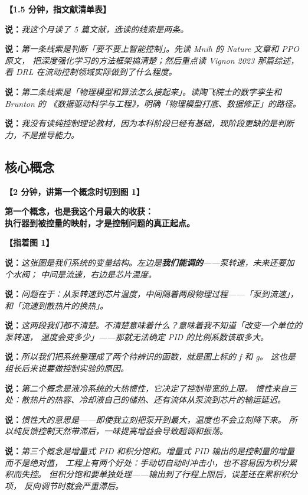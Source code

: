 \documentclass[11pt,a4paper]{ctexart}
\newcommand{\shuo}[1]{\par{\color{cBlue}\bfseries 说：}{\itshape #1}\par}
\newcommand{\dongzuo}[1]{\par{\color{cWarnLine}\bfseries 【#1】}\par}
\begin{document}
\dongzuo{1.5 分钟，指文献清单表}

\shuo{我这个月读了 5 篇文献，选读的线索是两条。}

\shuo{第一条线索是判断「要不要上智能控制」。先读 Mnih 的 Nature 文章和 PPO 原文，
把深度强化学习的方法框架搞清楚；然后重点读 Vignon 2023 那篇综述，
看 DRL 在流动控制领域实际做到了什么程度。}

\shuo{第二条线索是「物理模型和算法怎么接起来」。读陶飞院士的数字孪生和 Brunton 的
《数据驱动科学与工程》，明确「物理模型打底、数据修正」的路径。}

\shuo{我没有读纯控制理论教材，因为本科阶段已经有基础，现阶段更缺的是判断力，不是推导能力。}

\subsection{核心概念}

\dongzuo{2 分钟，讲第一个概念时切到图 1}

\begin{yaodian}
\textbf{第一个概念，也是我这个月最大的收获：}\\
\textbf{执行器到被控量的映射，才是控制问题的真正起点。}
\end{yaodian}

\dongzuo{指着图 1}

\shuo{这张图是我们系统的变量结构。左边是\textbf{我们能调的}——泵转速，未来还要加个水阀；
中间是流速，右边是芯片温度。}

\shuo{问题在于：从泵转速到芯片温度，中间隔着两段物理过程——「泵到流速」，
和「流速到散热片的换热」。}

\shuo{这两段我们都不清楚。不清楚意味着什么？意味着我不知道「改变一个单位的泵转速，
温度会变多少」——那就无法确定 PID 的比例系数该取多大。}

\shuo{所以我们把系统整理成了两个待辨识的函数，就是图上标的 f 和 g。
这也是组长后来说要做控制实验的原因。}

\shuo{第二个概念是液冷系统的大热惯性，它决定了控制带宽的上限。
惯性来自三处：散热片的热容、冷却液自己的储热、还有流体从泵流到芯片的输运延迟。}

\shuo{惯性大的意思是——即使我立刻把泵开到最大，温度也不会立刻降下来。
所以纯反馈控制天然带滞后，一味提高增益会导致超调和振荡。}

\shuo{第三个概念是增量式 PID 和积分饱和。增量式 PID 输出的是控制量的增量而不是绝对值，
工程上有两个好处：手动切自动时冲击小，也不容易因为积分累积而失控。
但积分饱和要单独处理——输出到了行程上限后，误差还在累积积分项，
反向调节时就会严重滞后。}
\end{document}
